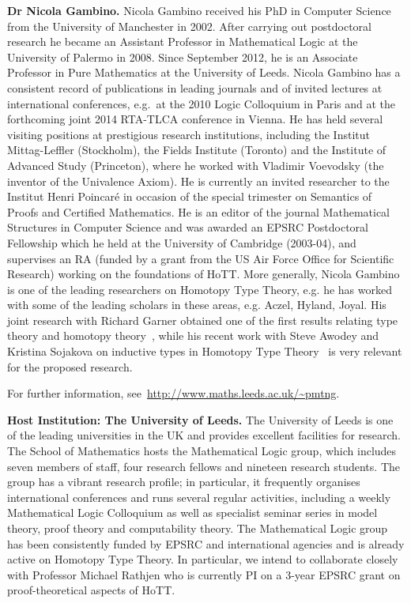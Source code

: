 \documentclass[a4paper,11pt]{article}
\begin{document}
\textbf{Dr Nicola Gambino.} Nicola Gambino received his PhD in
Computer Science from the University of Manchester in 2002. After
carrying out postdoctoral research he became an Assistant Professor in
Mathematical Logic at the University of Palermo in 2008. Since
September 2012, he is an Associate Professor in Pure Mathematics at the
University of Leeds. Nicola Gambino has a consistent record of
publications in leading journals and of invited lectures at
international conferences, {e.g.}~at the 2010 Logic Colloquium in Paris
and at the forthcoming joint 2014 RTA-TLCA conference in Vienna. He
has held several visiting positions at prestigious research
institutions, including the Institut Mittag-Leffler (Stockholm), the
Fields Institute (Toronto) and the Institute of Advanced Study
(Princeton), where he worked with Vladimir Voevodsky (the inventor of
the Univalence Axiom).  He is currently an invited researcher to the
Institut Henri Poincar\'e in occasion of the special trimester on
Semantics of Proofs and Certified Mathematics.  He is an editor of the
journal Mathematical Structures in Computer Science and was awarded
an EPSRC Postdoctoral Fellowship which he held at the University of Cambridge (2003-04), and supervises
an RA (funded by a grant from the US Air Force Office for Scientific
Research) working on the foundations of HoTT. More generally, Nicola Gambino is
one of the leading researchers on Homotopy Type Theory, {e.g.}  he has
worked with some of the leading scholars in these areas, {e.g.}
Aczel, Hyland, Joyal. His joint research with Richard
Garner obtained one of the first results relating  type
theory and homotopy theory~\cite{GambinoN:idetwfs}, while his recent work with Steve Awodey
and Kristina Sojakova on inductive types in Homotopy Type Theory~\cite{AwodeyS:indtht} is
very relevant for the proposed research.

For further information,  see~\url{http://www.maths.leeds.ac.uk/~pmtng}.

\textbf{Host Institution: The University of Leeds.} The University of
Leeds is one of the leading universities in the UK and provides
excellent facilities for research. The School of Mathematics hosts the
Mathematical Logic group, which includes seven members of staff, four
research fellows and nineteen research students. The group has a
vibrant research profile; in particular, it frequently organises
international conferences and runs several regular activities,
including a weekly Mathematical Logic Colloquium as well as specialist
seminar series in model theory, proof theory and computability
theory. The Mathematical Logic group has been consistently funded by
EPSRC and international agencies and is already active on Homotopy
Type Theory. In particular, we intend to collaborate closely with
Professor Michael Rathjen who is currently PI
on a 3-year EPSRC grant on proof-theoretical aspects of HoTT. 
\end{document}
